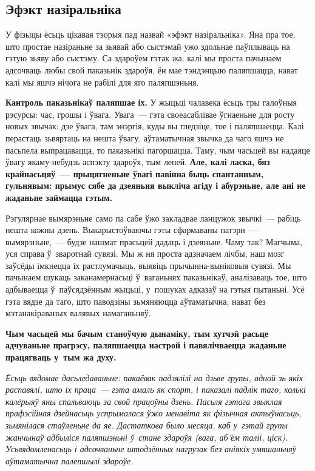 \subsection*{Эфэкт назіральніка}

У фізыцы ёсьць цікавая тэорыя пад назвай «эфэкт назіральніка». Яна пра тое, што простае назіраньне за зьявай або сыстэмай ужо здольнае паўплываць на гэтую зьяву або сыстэму. Са здароўем гэтак жа: калі мы проста пачынаем адсочваць любы свой паказьнік здароўя, ён мае тэндэнцыю паляпшацца, нават калі мы яшчэ нічога не рабілі для яго паляпшэньня.

\textbf{Кантроль паказьнікаў паляпшае іх.} У жыцьці чалавека ёсьць тры галоўныя рэсурсы: час, грошы і ўвага. Увага~--- гэта своеасаблівае ўгнаеньне для росту новых звычак: дзе ўвага, там энэргія, куды вы гледзіце, тое і паляпшаецца. Калі перастаць зьвяртаць на нешта ўвагу, аўтаматычная звычка да чаго яшчэ не пасьпела выпрацавацца, то паказьнікі пагоршацца. Таму, чым часьцей вы надаяце ўвагу якаму-небудзь аспэкту здароўя, тым лепей. \textbf{Але, калі ласка, бяз крайнасьцяў~--- прыцягненьне ўвагі павінна быць спантанным, гульнявым: прымус сябе да дзеяньня выкліча агіду і абурэньне, але ані не жаданьне займацца гэтым.}

Рэгулярнае вымярэньне само па сабе ўжо закладвае ланцужок звычкі~--- рабіць нешта кожны дзень. Выкарыстоўваючы гэты сфармаваны патэрн~--- вымярэньне,~--- будзе нашмат прасьцей дадаць і дзеяньне. Чаму так? Магчыма, уся справа ў~зваротнай сувязі. Мы ж ня проста адзначаем лічбы, наш мозг заўсёды імкнецца іх растлумачыць, выявіць прычынна-выніковыя сувязі. Мы пачынаем шукаць заканамернасьці ў~ваганьнях паказьнікаў, аналізаваць тое, што адбываецца ў~паўсядзённым жыцьці, у~пошуках адказаў на гэтыя пытаньні. Усё гэта вядзе да таго, што паводзіны зьмяняюцца аўтаматычна, нават без мэтанакіраваных валявых намаганьняў. 

\textbf{Чым часьцей мы бачым станоўчую дынаміку, тым хутчэй расьце адчуваньне прагрэсу, паляпшаецца настрой і павялічваецца жаданьне працягваць у~тым жа духу.}

\emph{Ёсьць вядомае дасьледаваньне: пакаёвак падзялілі на дзьве групы, адной зь якіх распавялі, што іх праца~--- гэта амаль як спорт, і паказалі падлік таго, колькі калёрыяў яны спальваюць за свой працоўны дзень. Пасьля гэтага звыклая прафэсійная дзейнасьць успрымалася ўжо менавіта як фізычная актыўнасьць, зьмянілася стаўленьне да яе. Дастаткова было месяца, каб у~гэтай групы жанчынаў адбыліся паляпшэньні ў~стане здароўя (вага, аб'ём таліі, ціск). Усьвядомленасьць і адсочваньне штодзённых нагрузак без аніякіх умяшаньняў аўтаматычна палепшылі здароўе.}

